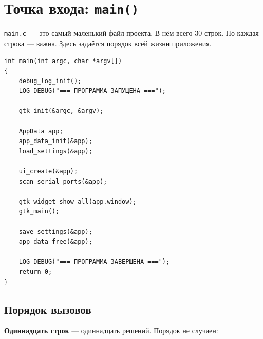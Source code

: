\section{Точка входа: \texttt{main()}}
\label{sec:lifecycle-main}

\texttt{main.c}~--- это самый маленький файл проекта.
В нём всего 30 строк. Но каждая строка — важна.
Здесь задаётся порядок всей жизни приложения.

\begin{listing}[htbp]
\begin{verbatim}
int main(int argc, char *argv[])
{
    debug_log_init();
    LOG_DEBUG("=== ПРОГРАММА ЗАПУЩЕНА ===");

    gtk_init(&argc, &argv);

    AppData app;
    app_data_init(&app);
    load_settings(&app);

    ui_create(&app);
    scan_serial_ports(&app);

    gtk_widget_show_all(app.window);
    gtk_main();

    save_settings(&app);
    app_data_free(&app);

    LOG_DEBUG("=== ПРОГРАММА ЗАВЕРШЕНА ===");
    return 0;
}
\end{verbatim}
\caption{\texttt{main()}~--- точка входа}
\label{lst:lifecycle-main}
\end{listing}

\subsection{Порядок вызовов}

\textbf{Одиннадцать строк} — одиннадцать решений.
Порядок не случаен:

